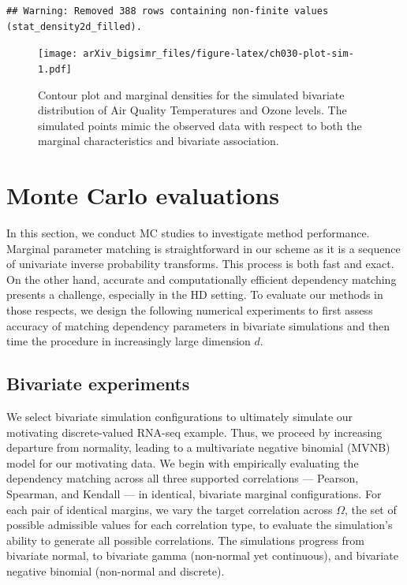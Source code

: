 \documentclass{article}
\begin{document}
\begin{verbatim}
## Warning: Removed 388 rows containing non-finite values (stat_density2d_filled).
\end{verbatim}

\begin{figure}
\centering
\texttt{[image: arXiv\_bigsimr\_files/figure-latex/ch030-plot-sim-1.pdf]}
\caption{Contour plot and marginal densities for the simulated bivariate
distribution of Air Quality Temperatures and Ozone levels. The simulated
points mimic the observed data with respect to both the marginal
characteristics and bivariate association.}
\end{figure}

\hypertarget{simulations}{%
\section{Monte Carlo evaluations}\label{simulations}}

In this section, we conduct MC studies to investigate method
performance. Marginal parameter matching is straightforward in our
scheme as it is a sequence of univariate inverse probability transforms.
This process is both fast and exact. On the other hand, accurate and
computationally efficient dependency matching presents a challenge,
especially in the HD setting. To evaluate our methods in those respects,
we design the following numerical experiments to first assess accuracy
of matching dependency parameters in bivariate simulations and then time
the procedure in increasingly large dimension \(d\).

\hypertarget{bivariate-experiments}{%
\subsection{Bivariate experiments}\label{bivariate-experiments}}

We select bivariate simulation configurations to ultimately simulate our
motivating discrete-valued RNA-seq example. Thus, we proceed by
increasing departure from normality, leading to a multivariate negative
binomial (MVNB) model for our motivating data. We begin with empirically
evaluating the dependency matching across all three supported
correlations --- Pearson, Spearman, and Kendall --- in identical,
bivariate marginal configurations. For each pair of identical margins,
we vary the target correlation across \(\Omega\), the set of possible
admissible values for each correlation type, to evaluate the
simulation's ability to generate all possible correlations. The
simulations progress from bivariate normal, to bivariate gamma
(non-normal yet continuous), and bivariate negative binomial (non-normal
and discrete).
\end{document}
